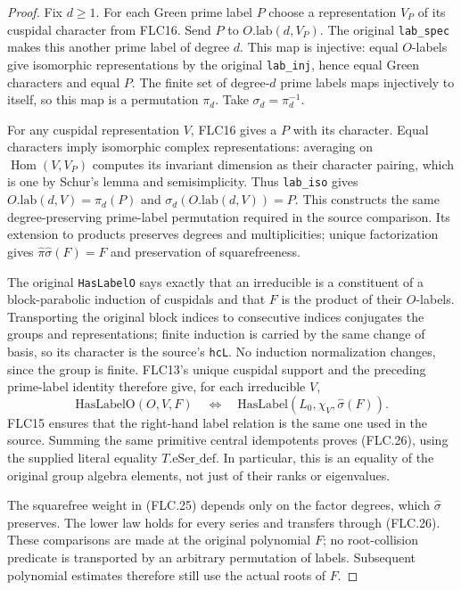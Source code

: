 \documentclass[11pt,a4paper]{article}
\numberwithin{equation}{section}
\theoremstyle{remark}\newtheorem{remark}[theorem]{Remark}
\begin{document}
\begin{proof}
Fix $d\ge1$.  For each Green prime label $P$ choose a
representation $V_P$ of its cuspidal character from FLC16.
Send $P$ to $O.\mathrm{lab}(d,V_P)$.
The original \texttt{lab\_\allowbreak spec} makes this another prime
label of degree $d$.  This map is injective: equal $O$-labels
give isomorphic representations by the original
\texttt{lab\_\allowbreak inj}, hence equal Green characters and equal
$P$.  The finite set of degree-$d$ prime labels maps
injectively to itself, so this map is a permutation $\pi_d$.
Take $\sigma_d=\pi_d^{-1}$.

For any cuspidal representation $V$, FLC16 gives a $P$ with
its character.  Equal characters imply isomorphic complex
representations: averaging on $\operatorname{Hom}(V,V_P)$
computes its invariant dimension as their character pairing,
which is one by Schur's lemma and semisimplicity.
Thus \texttt{lab\_\allowbreak iso} gives
$O.\mathrm{lab}(d,V)=\pi_d(P)$ and
$\sigma_d(O.\mathrm{lab}(d,V))=P$.
This constructs the same degree-preserving prime-label
permutation required in the source comparison.
Its extension to products preserves degrees and
multiplicities; unique factorization gives
$\widehat\pi\widehat\sigma(F)=F$ and preservation of
squarefreeness.

The original \texttt{Has\allowbreak Label\allowbreak O} says exactly that an
irreducible is a constituent of a block-parabolic induction
of cuspidals and that $F$ is the product of their $O$-labels.
Transporting the original block indices to consecutive
indices conjugates the groups and representations; finite
induction is carried by the same change of basis, so its
character is the source's \texttt{hc\allowbreak L}.  No induction
normalization changes, since the group is finite.
FLC13's unique cuspidal support and the preceding prime-label
identity therefore give, for each irreducible $V$,
\[
 \mathrm{HasLabelO}(O,V,F)
 \quad\Longleftrightarrow\quad
 \mathrm{HasLabel}(L_0,\chi_V,\widehat\sigma(F)).
\]
FLC15 ensures that the right-hand label relation is the
same one used in the source.  Summing the same primitive
central idempotents proves (FLC.26), using the supplied
literal equality $T.\mathrm{eSer\_\allowbreak def}$.
In particular, this is an equality of the original group
algebra elements, not just of their ranks or eigenvalues.

The squarefree weight in (FLC.25) depends only on the factor
degrees, which $\widehat\sigma$ preserves.  The lower law
holds for every series and transfers through (FLC.26).
These comparisons are made at the original polynomial $F$;
no root-collision predicate is transported by an arbitrary
permutation of labels.  Subsequent polynomial estimates
therefore still use the actual roots of $F$.
\end{proof}
\end{document}
